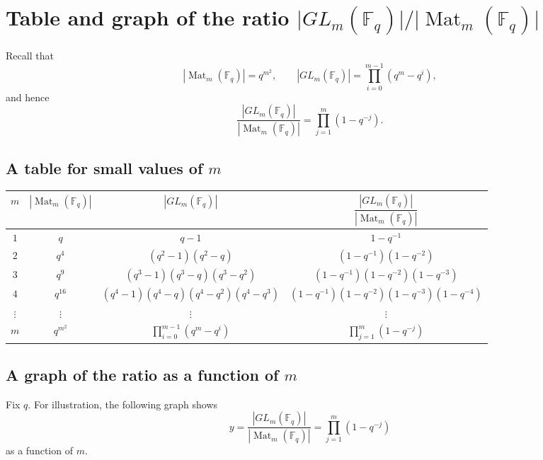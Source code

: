 \documentclass[11pt]{article}
\newcommand{\F}{\mathbb{F}}
\newcommand{\Mat}{\operatorname{Mat}}
\theoremstyle{definition}
\theoremstyle{plain}
\begin{document}
	\newpage
	\section{Table and graph of the ratio \(\lvert GL_m(\F_q)\rvert/\lvert \Mat_m(\F_q)\rvert\)}
	
	Recall that
	\[
	|\Mat_m(\F_q)|=q^{m^2},
	\qquad
	|GL_m(\F_q)|=\prod_{i=0}^{m-1}(q^m-q^i),
	\]
	and hence
	\[
	\frac{|GL_m(\F_q)|}{|\Mat_m(\F_q)|}
	=
	\prod_{j=1}^{m}(1-q^{-j}).
	\]
	
	\subsection{A table for small values of \(m\)}
	
	\begin{center}
		\renewcommand{\arraystretch}{1.4}
		\begin{tabular}{c c c c}
			\toprule
			\(m\) & \(|\Mat_m(\F_q)|\) & \(|GL_m(\F_q)|\) & \(\dfrac{|GL_m(\F_q)|}{|\Mat_m(\F_q)|}\)\\
			\midrule
			\(1\) &
			\(q\) &
			\(q-1\) &
			\(1-q^{-1}\) \\
			
			\(2\) &
			\(q^4\) &
			\((q^2-1)(q^2-q)\) &
			\((1-q^{-1})(1-q^{-2})\) \\
			
			\(3\) &
			\(q^9\) &
			\((q^3-1)(q^3-q)(q^3-q^2)\) &
			\((1-q^{-1})(1-q^{-2})(1-q^{-3})\) \\
			
			\(4\) &
			\(q^{16}\) &
			\((q^4-1)(q^4-q)(q^4-q^2)(q^4-q^3)\) &
			\((1-q^{-1})(1-q^{-2})(1-q^{-3})(1-q^{-4})\) \\
			
			\(\vdots\) &
			\(\vdots\) &
			\(\vdots\) &
			\(\vdots\) \\
			
			\(m\) &
			\(q^{m^2}\) &
			\(\displaystyle\prod_{i=0}^{m-1}(q^m-q^i)\) &
			\(\displaystyle\prod_{j=1}^{m}(1-q^{-j})\) \\
			\bottomrule
		\end{tabular}
	\end{center}
	
	\subsection{A graph of the ratio as a function of \(m\)}
	
	Fix \(q\). For illustration, the following graph shows
	\[
	y=\frac{|GL_m(\F_q)|}{|\Mat_m(\F_q)|}
	=
	\prod_{j=1}^{m}(1-q^{-j})
	\]
	as a function of \(m\).
	
\end{document}
